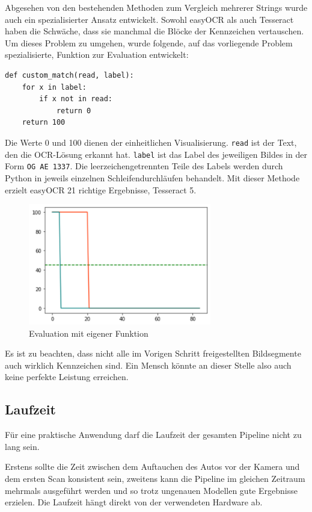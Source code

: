 Abgesehen von den bestehenden Methoden zum Vergleich mehrerer Strings wurde auch ein spezialisierter Ansatz entwickelt. Sowohl easyOCR als auch Tesseract haben die Schwäche, dass sie manchmal die Blöcke der Kennzeichen vertauschen. Um dieses Problem zu umgehen, wurde folgende, auf das vorliegende Problem spezialisierte, Funktion zur Evaluation entwickelt:

\begin{lstlisting} 
def custom_match(read, label):	
    for x in label:
        if x not in read:
            return 0
    return 100
\end{lstlisting}     
Die Werte 0 und 100 dienen der einheitlichen Visualisierung. \lstinline{read} ist der Text, den die OCR-Lösung erkannt hat. \lstinline{label} ist das Label des jeweiligen Bildes in der Form \lstinline{OG AE 1337}. Die leerzeichengetrennten Teile des Labels werden durch Python in jeweils einzelnen Schleifendurchläufen behandelt.
Mit dieser Methode erzielt easyOCR 21 richtige Ergebnisse, Tesseract 5.
\begin{figure}[h]
	\includegraphics[width=8cm]{./img/evaluation_custom_matcher.svg}
	\caption{Evaluation mit eigener Funktion}
\end{figure}


Es ist zu beachten, dass nicht alle im Vorigen Schritt freigestellten Bildsegmente auch wirklich Kennzeichen sind. Ein Mensch könnte an dieser Stelle also auch keine perfekte Leistung erreichen. 

\subsection{Laufzeit}

Für eine praktische Anwendung darf die Laufzeit der gesamten Pipeline nicht zu lang sein.

Erstens sollte die Zeit zwischen dem Auftauchen des Autos vor der Kamera und dem ersten Scan konsistent sein,
zweitens kann die Pipeline im gleichen Zeitraum mehrmals ausgeführt werden und so trotz ungenauen Modellen gute Ergebnisse erzielen.
Die Laufzeit hängt direkt von der verwendeten Hardware ab.

